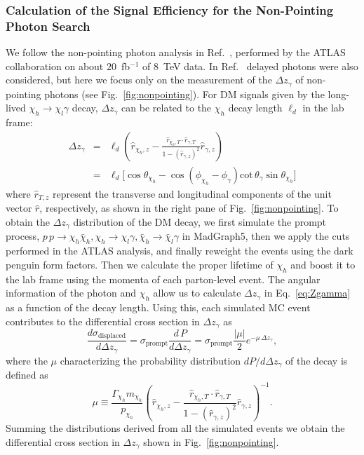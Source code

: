 \subsubsection{Calculation of the Signal Efficiency for the Non-Pointing Photon Search}
%
We follow the non-pointing photon analysis in Ref.~\cite{Aad:2014gfa}, performed
by the ATLAS collaboration on about $20$~fb$^{-1}$ of $8$~TeV data. In
Ref.~\cite{Aad:2014gfa} delayed photons were also considered, but here we focus
only on the measurement of the $\Delta z_{\gamma}$ of non-pointing photons (see
Fig.~\ref{fig:nonpointing}). For DM signals given by the long-lived
$\chi_h\to\chi_l\gamma$ decay, $\Delta z_{\gamma}$ can be related to the
$\chi_h$ decay length $\ell_{d}$ in the lab frame:
\begin{eqnarray}\label{eq:Zgamma}
\Delta z_{\gamma}&=&\ell_d\left(\hat{r}_{\chi_h,z}-\frac{\hat{r}_{\chi_h,T}\cdot\hat{r}_{\gamma,T}}{1-(\hat{r}_{\gamma,z})^2}\hat{r}_{\gamma,z}\right)\nonumber\\
& =& \ell_d \Big[\cos\theta_{\chi_h} -\cos (\phi_{\chi_h} - \phi_\gamma)\mathrm{cot}\,\theta_\gamma \sin \theta_{\chi_h} \Big]
\end{eqnarray}
where $\hat{r}_{T,z}$ represent the transverse and longitudinal components of
the unit vector $\hat{r}$, respectively, as shown in
the right pane of Fig.~\ref{fig:nonpointing}.
To obtain the $\Delta z_{\gamma}$ distribution of the DM decay, we first
simulate the prompt process, $p\,p \to \chi_h\bar{\chi}_h,
\chi_h\to\chi_l\gamma, \bar{\chi}_h\to\bar{\chi}_l\gamma$ in MadGraph5, then we
apply the cuts performed in the ATLAS analysis, and finally reweight the events
using the dark penguin form factors. Then we calculate the proper lifetime of
$\chi_h$ and boost it to the lab frame using the momenta of each parton-level
event. The angular information of the photon and $\chi_h$ allow us to calculate
$\Delta z_{\gamma}$ in Eq.~\eqref{eq:Zgamma} as a function of the decay length.
Using this, each simulated MC event contributes to the differential cross
section in $\Delta z_{\gamma}$ as
\begin{equation} \label{eq:displdistr}
\frac{d\sigma_{\text{displaced}}}{d\Delta z_{\gamma}} =\sigma_{\text{prompt}}\frac{d\,P}{d\Delta z_{\gamma}}=\sigma_{\text{prompt}}\frac{|\mu|}{2} e^{-\mu\,\Delta z_{\gamma}},
\end{equation}
where the $\mu$ characterizing the probability distribution $dP/d\Delta z_\gamma$ of the decay is defined as
\begin{equation}
\mu\equiv\frac{\Gamma_{\chi_h}m_{\chi_h}}{p_{\chi_h}}\left(\hat{r}_{\chi_h,z}-\frac{\hat{r}_{\chi_h,T}\cdot\hat{r}_{\gamma,T}}{1-(\hat{r}_{\gamma,z})^2}\hat{r}_{\gamma,z}\right)^{-1}.
\end{equation}
Summing the distributions derived from all the simulated events we obtain the
differential cross section in $\Delta z_\gamma$ shown in Fig.~\ref{fig:nonpointing}.

